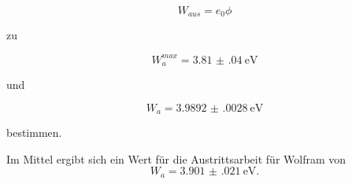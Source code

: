 \begin{equation}
    W_{aus}=e_0\phi
\end{equation}

zu

\begin{equation*}
    W_a^{max}=\SI{3.81(04)}{\eV} 
\end{equation*}

und

\begin{equation*}
W_a=\SI{3.9892(0028)}{\eV}
\end{equation*}

bestimmen.

Im Mittel ergibt sich ein Wert für die Austrittsarbeit für Wolfram von
\begin{equation}
   W_{a}=\SI{3.901(021)}{\eV}.
\end{equation}


%
